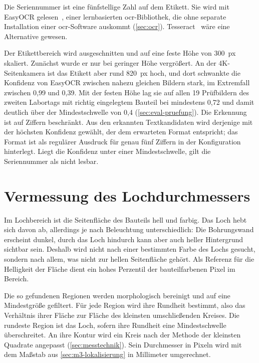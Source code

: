 Die Seriennummer ist eine fünfstellige Zahl auf dem Etikett. Sie wird mit EasyOCR
gelesen~\cite{easyocr}, einer lernbasierten \ac{ocr}-Bibliothek, die ohne separate
Installation einer \ac{ocr}-Software auskommt (\cref{sec:ocr}). Tesseract~\cite{smith2007}
wäre eine Alternative gewesen.

Der Etikettbereich wird ausgeschnitten und auf eine feste Höhe von \SI{300}{px} skaliert.
Zunächst wurde er nur bei geringer Höhe vergrößert. An der 4K-Seitenkamera ist das Etikett aber
rund \SI{820}{px} hoch, und dort schwankte die Konfidenz von EasyOCR zwischen nahezu gleichen
Bildern stark, im Extremfall zwischen 0,99 und 0,39. Mit der festen Höhe lag sie auf allen
19 Prüfbildern des zweiten Labortags mit richtig eingelegtem Bauteil bei mindestens 0,72 und
damit deutlich über der Mindestschwelle von 0,4 (\cref{sec:eval-pruefung}). Die Erkennung ist auf Ziffern
beschränkt. Aus den erkannten Textkandidaten wird derjenige mit der höchsten Konfidenz
gewählt, der dem erwarteten Format entspricht; das Format ist als regulärer Ausdruck für
genau fünf Ziffern in der Konfiguration hinterlegt. Liegt die Konfidenz unter einer
Mindestschwelle, gilt die Seriennummer als nicht lesbar.

\section{Vermessung des Lochdurchmessers}
\label{sec:m3-loch}

Im Lochbereich ist die Seitenfläche des Bauteils hell und farbig. Das Loch hebt sich davon ab,
allerdings je nach Beleuchtung unterschiedlich: Die Bohrungswand erscheint dunkel, durch das
Loch hindurch kann aber auch heller Hintergrund sichtbar sein. Deshalb wird nicht nach einer
bestimmten Farbe des Lochs gesucht, sondern nach allem, was nicht zur hellen Seitenfläche
gehört. Als Referenz für die Helligkeit der Fläche dient ein hohes Perzentil der
bauteilfarbenen Pixel im Bereich.

Die so gefundenen Regionen werden morphologisch bereinigt und auf eine Mindestgröße gefiltert.
Für jede Region wird ihre Rundheit bestimmt, also das Verhältnis ihrer Fläche zur Fläche des
kleinsten umschließenden Kreises. Die rundeste Region ist das Loch, sofern ihre Rundheit eine
Mindestschwelle überschreitet. An ihre Kontur wird ein Kreis nach der Methode der kleinsten
Quadrate angepasst (\cref{sec:messtechnik}). Sein Durchmesser in Pixeln wird mit dem Maßstab aus
\cref{sec:m3-lokalisierung} in Millimeter umgerechnet.

